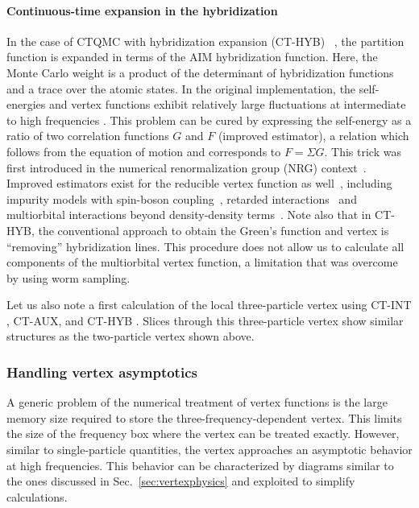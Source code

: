 \documentclass[rmp,aps,reprint,amsmath,amssymb,superscriptaddress,showpacs,nofootinbib]{revtex4-1}
\begin{document}
\paragraph{Continuous-time expansion in the hybridization}

In the case of CTQMC with hybridization expansion  (CT-HYB) ~\cite{Werner2006,Werner2006a}, the partition function is expanded in terms of the AIM hybridization function. Here, the Monte Carlo weight is a product of the determinant of hybridization functions and a trace over the atomic states. In the original implementation, the self-energies and vertex functions exhibit relatively large fluctuations at intermediate to high frequencies \cite{Gull2007,Hafermann2012}. This problem can be cured by expressing the self-energy as a ratio of two correlation functions $G$ and $F$ (improved estimator), a relation which follows from the equation of motion and corresponds to $F=\Sigma G$. This trick was first introduced in the numerical renormalization group (NRG) context~\cite{Bulla1998,Bulla2008}. Improved estimators exist for the reducible vertex function as well~\cite{Hafermann2012}, including impurity models with spin-boson coupling~\cite{Otsuki2013}, retarded interactions~\cite{Hafermann2014} and multiorbital interactions beyond density-density terms~\cite{Gunacker2016}. Note also that in CT-HYB, the conventional approach to obtain the Green's function and vertex is ``removing'' hybridization lines. This procedure does not allow us to calculate all components of the multiorbital vertex function, a limitation that was overcome by  using worm sampling. 

Let us also note a first calculation of the local three-particle vertex using  CT-INT \cite{Hafermann2009}, CT-AUX, and CT-HYB \cite{Ribic2017b}. Slices through this three-particle vertex show similar structures as the two-particle vertex shown above.

\subsubsection{Handling vertex asymptotics} 

A generic problem of the numerical treatment of vertex functions is the large memory size required to store the three-frequency-dependent vertex. This limits the size of the frequency box where the vertex can be treated exactly. However, similar to single-particle quantities, the vertex approaches an asymptotic behavior at high frequencies. This behavior can be characterized by diagrams similar to the ones discussed in Sec.~\ref{sec:vertexphysics} and exploited to simplify calculations.
\end{document}
